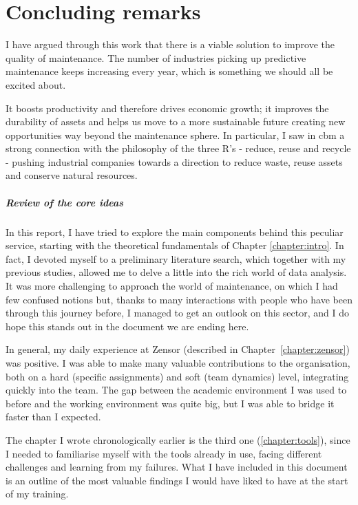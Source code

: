 \chapter{Concluding remarks}
I have argued through this work that there is a viable solution to improve the quality of maintenance. %
The number of industries picking up predictive maintenance keeps increasing every year, which is something we should all be excited about. 

It boosts productivity and therefore drives economic growth; it improves the durability of assets and helps us move to a more sustainable future creating new opportunities way beyond the maintenance sphere.
In particular, I saw in \acl{cbm} a strong connection with the philosophy of the three R's - reduce, reuse and recycle - pushing industrial companies towards a direction to reduce waste, reuse assets and conserve natural resources. 

\paragraph{Review of the core ideas}
In this report, I have tried to explore the main components behind this peculiar service, starting with the theoretical fundamentals of Chapter \ref{chapter:intro}. 
In fact, I devoted myself to a preliminary literature search, which together with my previous studies, allowed me to delve a little into the rich world of data analysis. 
It was more challenging to approach the world of maintenance, on which I had few confused notions but, thanks to many interactions with people who have been through this journey before, 
I managed to get an outlook on this sector, and I do hope this stands out in the document we are ending here.

In general, my daily experience at Zensor (described in Chapter~\ref{chapter:zensor}) was positive. I was able to make many valuable contributions to the organisation, 
both on a hard (specific assignments) and soft (team dynamics) level, integrating quickly into the team. 
The gap between the academic environment I was used to before and the working environment was quite big, but I was able to bridge it faster than I expected.

The chapter I wrote chronologically earlier is the third one (\ref{chapter:tools}), since I needed to familiarise myself with the tools already in use, facing different challenges and learning from my failures.
What I have included in this document is an outline of the most valuable findings I would have liked to have at the start of my training.

